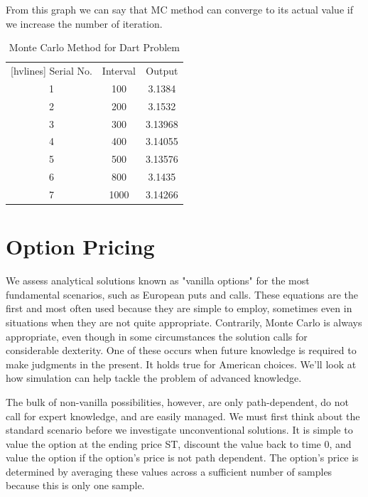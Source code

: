 \noindent From this graph we can say that MC method can converge to its actual value if we increase the number of iteration. 


\begin{table}[H]
	\begin{center}
		\begin{NiceTabular}{|c|c|c|}[hvlines]
			 Serial No. & Interval & Output  \\ 
			1 & 100 & 3.1384 \\
			2 & 200 & 3.1532 \\
			3 & 300 & 3.13968 \\
			4 & 400 & 3.14055 \\
			5 & 500 & 3.13576  \\ 
			6 & 800 & 3.1435  \\ 
			7 & 1000 & 3.14266  \\
			
		\end{NiceTabular}
	\end{center}
	\caption{Monte Carlo Method for Dart Problem}
\end{table}


\section{Option Pricing}
\noindent We assess analytical solutions known as "vanilla options" for the most fundamental scenarios, such as European puts and calls. These equations are the first and most often used because they are simple to employ, sometimes even in situations when they are not quite appropriate. Contrarily, Monte Carlo is always appropriate, even though in some circumstances the solution calls for considerable dexterity. One of these occurs when future knowledge is required to make judgments in the present. It holds true for American choices. We'll look at how simulation can help tackle the problem of advanced knowledge.

The bulk of non-vanilla possibilities, however, are only path-dependent, do not call for expert knowledge, and are easily managed. We must first think about the standard scenario before we investigate unconventional solutions. It is simple to value the option at the ending price ST, discount the value back to time 0, and value the option if the option's price is not path dependent. The option's price is determined by averaging these values across a sufficient number of samples because this is only one sample.

